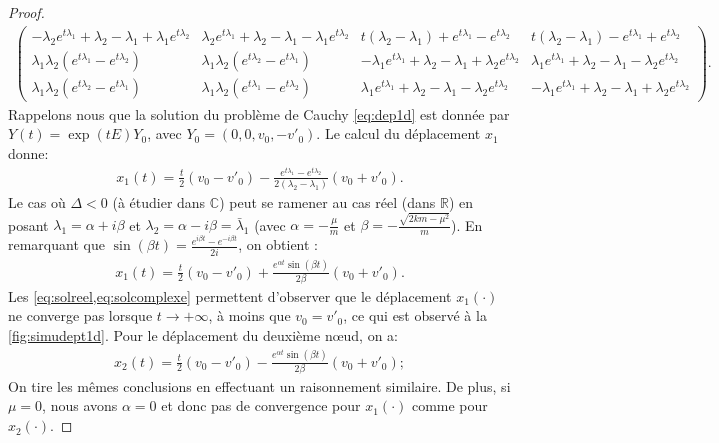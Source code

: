 \begin{proof}
\begin{align*}
\begin{pmatrix}
         -\lambda_2e^{t\lambda_1} + \lambda_2 - \lambda_1 + \lambda_1e^{t\lambda_2} & \lambda_2e^{t\lambda_1} + \lambda_2 - \lambda_1 - \lambda_1e^{t\lambda_2} & t(\lambda_2 -\lambda_1) + e^{t\lambda_1} - e^{t\lambda_2} & t(\lambda_2 -\lambda_1) - e^{t\lambda_1} + e^{t\lambda_2} \\
          \lambda_1\lambda_2 (e^{t\lambda_1} - e^{t\lambda_2}) & \lambda_1\lambda_2 (e^{t\lambda_2} - e^{t\lambda_1})  & -\lambda_1e^{t\lambda_1} + \lambda_2 - \lambda_1 + \lambda_2e^{t\lambda_2} & \lambda_1e^{t\lambda_1} + \lambda_2 - \lambda_1 - \lambda_2e^{t\lambda_2} \\
          \lambda_1\lambda_2 (e^{t\lambda_2} - e^{t\lambda_1})  & \lambda_1\lambda_2 (e^{t\lambda_1} - e^{t\lambda_2})  & \lambda_1e^{t\lambda_1} + \lambda_2 - \lambda_1 - \lambda_2e^{t\lambda_2} & -\lambda_1e^{t\lambda_1} + \lambda_2 - \lambda_1 + \lambda_2e^{t\lambda_2}
    \end{pmatrix}.
\end{align*}
Rappelons nous que la solution du problème de Cauchy \cref{eq:dep1d} est donnée par $Y(t) = \exp(tE)Y_0$, avec $Y_0 = (0,0,v_0,-v'_0)$. Le calcul du déplacement $x_1$ donne:
\begin{align} \label{eq:solreel}
    x_1(t) = \frac{t}{2}\left( v_0 - v'_0 \right) - \frac{e^{t\lambda_1} - e^{t\lambda_2}}{2(\lambda_2 - \lambda_1)}\left( v_0 + v'_0 \right).
\end{align}
Le cas où $\Delta < 0$ (à étudier dans $\mathbb{C}$) peut se ramener au cas réel (dans $\mathbb{R}$) en posant $\lambda_1 = \alpha + i \beta$ et $\lambda_2 = \alpha - i \beta = \bar{\lambda}_1$ (avec $\alpha = -\frac{\mu}{m}$ et $\beta = -\frac{\sqrt{2km - \mu^2}}{m}$). En remarquant que $\sin(\beta t) = \frac{e^{i\beta t} - e^{-i\beta t}}{2i}$, on obtient :
\begin{align} \label{eq:solcomplexe}
    x_1(t) = \frac{t}{2}\left( v_0 - v'_0 \right) + \frac{e^{\alpha t} \sin(\beta t)}{2\beta} \left( v_0 + v'_0 \right).
\end{align}
Les \cref{eq:solreel,eq:solcomplexe} permettent d'observer que le déplacement $x_1(\cdot)$ ne converge pas lorsque $t \rightarrow +\infty$, à moins que $v_0 = v'_0$, ce qui est observé à la \cref{fig:simudept1d}. Pour le déplacement du deuxième n\oe{}ud, on a:
\begin{align} \label{eq:solcomplexe}
    x_2(t) = \frac{t}{2}\left( v_0 - v'_0 \right) - \frac{e^{\alpha t} \sin(\beta t)}{2\beta} \left( v_0 + v'_0 \right);
\end{align}
On tire les mêmes conclusions en effectuant un raisonnement similaire. De plus, si $\mu=0$, nous avons $\alpha=0$ et donc pas de convergence pour $x_1(\cdot)$ comme pour $x_2(\cdot)$. 

\end{proof}










